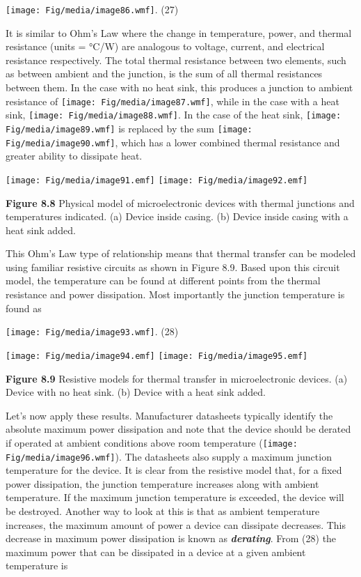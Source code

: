 \texttt{[image: Fig/media/image86.wmf]}. (27)

It is similar to Ohm's Law where the change in temperature, power, and
thermal resistance (units = °C/W) are analogous to voltage, current, and
electrical resistance respectively. The total thermal resistance between
two elements, such as between ambient and the junction, is the sum of
all thermal resistances between them. In the case with no heat sink,
this produces a junction to ambient resistance of
\texttt{[image: Fig/media/image87.wmf]}, while in the case with a heat
sink, \texttt{[image: Fig/media/image88.wmf]}. In the case of the heat
sink, \texttt{[image: Fig/media/image89.wmf]} is replaced by the sum
\texttt{[image: Fig/media/image90.wmf]}, which has a lower combined
thermal resistance and greater ability to dissipate heat.

\texttt{[image: Fig/media/image91.emf]}
\texttt{[image: Fig/media/image92.emf]}

\textbf{Figure 8.8} Physical model of microelectronic devices with
thermal junctions and temperatures indicated. (a) Device inside casing.
(b) Device inside casing with a heat sink added.

This Ohm's Law type of relationship means that thermal transfer can be
modeled using familiar resistive circuits as shown in Figure 8.9. Based
upon this circuit model, the temperature can be found at different
points from the thermal resistance and power dissipation. Most
importantly the junction temperature is found as

\texttt{[image: Fig/media/image93.wmf]}. (28)

\texttt{[image: Fig/media/image94.emf]}
\texttt{[image: Fig/media/image95.emf]}

\textbf{Figure 8.9} Resistive models for thermal transfer in
microelectronic devices. (a) Device with no heat sink. (b) Device with a
heat sink added.

Let's now apply these results. Manufacturer datasheets typically
identify the absolute maximum power dissipation and note that the device
should be derated if operated at ambient conditions above room
temperature (\texttt{[image: Fig/media/image96.wmf]}). The datasheets
also supply a maximum junction temperature for the device. It is clear
from the resistive model that, for a fixed power dissipation, the
junction temperature increases along with ambient temperature. If the
maximum junction temperature is exceeded, the device will be destroyed.
Another way to look at this is that as ambient temperature increases,
the maximum amount of power a device can dissipate decreases. This
decrease in maximum power dissipation is known as
\emph{\textbf{derating}}. From (28) the maximum power that can be
dissipated in a device at a given ambient temperature is

